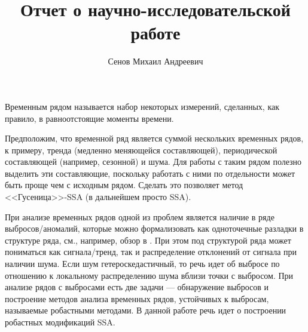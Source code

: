 \documentclass[specialist,
               substylefile = spbu.rtx,
               subf,href,colorlinks=true, 12pt]{disser}
\begin{document}

\title{Отчет о научно-исследовательской работе}


\author{Сенов Михаил Андреевич}


\date{\number\year}

\maketitle

\tableofcontents

\intro
Временным рядом называется набор некоторых измерений, сделанных, как правило, в равноотстоящие моменты времени.

Предположим, что временной ряд является суммой нескольких временных рядов, к примеру, тренда (медленно меняющейся составляющей), периодической составляющей (например, сезонной) и шума. Для работы с таким рядом полезно выделить эти составляющие, поскольку работать с ними по отдельности может быть проще чем с исходным рядом. Сделать это позволяет метод <<Гусеница>>-SSA (в дальнейшем просто SSA).

При анализе временных рядов одной из проблем является наличие в ряде выбросов/аномалий, которые можно формализовать как одноточечные разладки в структуре ряда, см., например, обзор в \cite{BlazquezGarcia2022}. При этом под структурой ряда может пониматься как сигнала/тренд, так и распределение отклонений от сигнала при наличии шума. Если шум гетероскедастичный, то речь идет об выбросе по отношению к локальному распределению шума вблизи точки с выбросом. При анализе рядов с выбросами есть две задачи --- обнаружение выбросов и построение методов анализа временных рядов, устойчивых к выбросам, называемые робастными методами. В данной работе речь идет о построении робастных модификаций SSA.
\end{document}
